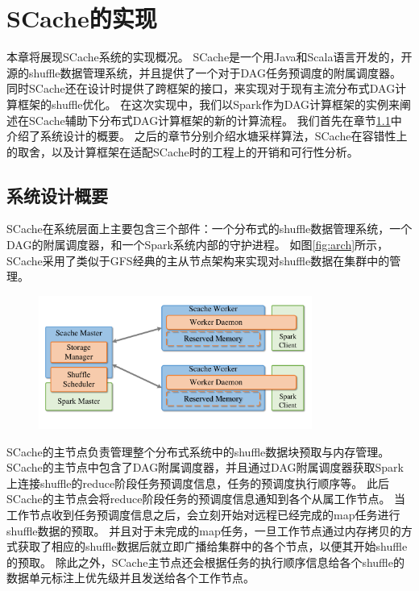 
\chapter{SCache的实现}
\label{chap:impl}

本章将展现SCache系统的实现概况。
SCache是一个用Java和Scala语言开发的，开源的shuffle数据管理系统，并且提供了一个对于DAG任务预调度的附属调度器。
同时SCache还在设计时提供了跨框架的接口，来实现对于现有主流分布式DAG计算框架的shuffle优化。
在这次实现中，我们以Spark作为DAG计算框架的实例来阐述在SCache辅助下分布式DAG计算框架的新的计算流程。
我们首先在章节\ref{sec:overview}中介绍了系统设计的概要。
之后的章节分别介绍水塘采样算法，SCache在容错性上的取舍，以及计算框架在适配SCache时的工程上的开销和可行性分析。

\section{系统设计概要}
\label{sec:overview}

SCache在系统层面上主要包含三个部件：一个分布式的shuffle数据管理系统，一个DAG的附属调度器，和一个Spark系统内部的守护进程。
如图\ref{fig:arch}所示，SCache采用了类似于GFS\cite{gfs}经典的主从节点架构来实现对shuffle数据在集群中的管理。

\begin{figure}[!htp]
	\centering
	\includegraphics[width=0.8\textwidth]{../../PPoPP-2018/fig/arch.pdf}
\end{figure}

SCache的主节点负责管理整个分布式系统中的shuffle数据块预取与内存管理。
SCache的主节点中包含了DAG附属调度器，并且通过DAG附属调度器获取Spark上连接shuffle的reduce阶段任务预调度信息，任务的预调度执行顺序等。
此后SCache的主节点会将reduce阶段任务的预调度信息通知到各个从属工作节点。
当工作节点收到任务预调度信息之后，会立刻开始对远程已经完成的map任务进行shuffle数据的预取。
并且对于未完成的map任务，一旦工作节点通过内存拷贝的方式获取了相应的shuffle数据后就立即广播给集群中的各个节点，以便其开始shuffle的预取。
除此之外，SCache主节点还会根据任务的执行顺序信息给各个shuffle的数据单元标注上优先级并且发送给各个工作节点。

